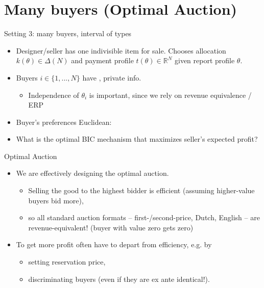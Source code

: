 \documentclass[english,10pt
,aspectratio=169
]{beamer}
\begin{document}
\section{Many buyers (Optimal Auction)}

\begin{frame}{Setting 3: many buyers, interval of types}
\begin{itemize}
	\item Designer/seller has one indivisible item for sale. Chooses allocation $k(\theta) \in \varDelta(N)$ and payment profile $t(\theta) \in \mathbb{R}^N$ given report profile $\theta$.
	\item Buyers $i \in \{1,...,N\}$ have , private info.
	\begin{itemize}
		\item Independence of $\theta_i$ is important, since we rely on revenue equivalence / ERP
	\end{itemize}
	\item Buyer's preferences Euclidean: 
	\item What is the optimal BIC mechanism that maximizes seller's expected profit?
\end{itemize}
\end{frame}


\begin{frame}{Optimal Auction}
\begin{itemize}
	\item We are effectively designing the optimal auction.
	\begin{itemize}
		\item Selling the good to the highest bidder is efficient (assuming higher-value buyers bid more),
		\item so all standard auction formats -- first-/second-price, Dutch, English -- are revenue-equivalent! (buyer with value zero gets zero)
	\end{itemize}
	\item To get more profit often have to depart from efficiency, e.g. by
	\begin{itemize}
		\item setting reservation price,
		\item discriminating buyers (even if they are ex ante identical!).
	\end{itemize}
\end{itemize}
\end{frame}
\end{document}
